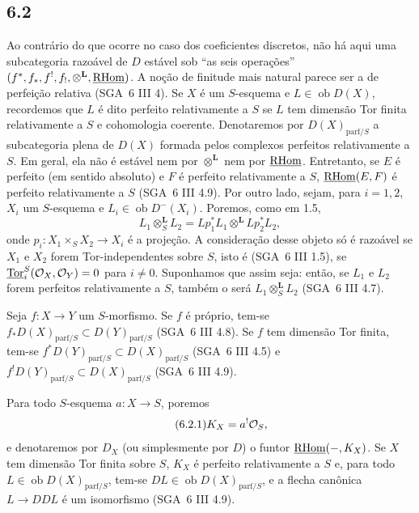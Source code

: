 \subsection*{6.2}
Ao contrário do que ocorre no caso dos coeficientes discretos, não há aqui uma subcategoria razoável de $D$ estável sob ``as seis operações'' $(f^*,f_*,f^!,f_!,\otimes^{\mathbf L},\underline{\mathrm{RHom}})$. A noção de finitude mais natural parece ser a de perfeição relativa (SGA~6 III 4). Se $X$ é um $S$-esquema e $L\in\operatorname{ob}D(X)$, recordemos que $L$ é dito perfeito relativamente a $S$ se $L$ tem dimensão Tor finita relativamente a $S$ e cohomologia coerente. Denotaremos por $D(X)_{\mathrm{parf}/S}$ a subcategoria plena de $D(X)$ formada pelos complexos perfeitos relativamente a $S$. Em geral, ela não é estável nem por $\otimes^{\mathbf L}$ nem por $\underline{\mathrm{RHom}}$. Entretanto, se $E$ é perfeito (em sentido absoluto) e $F$ é perfeito relativamente a $S$, $\underline{\mathrm{RHom}}(E,F)$ é perfeito relativamente a $S$ (SGA~6 III 4.9). Por outro lado, sejam, para $i=1,2$, $X_i$ um $S$-esquema e $L_i\in\operatorname{ob}D^{-}(X_i)$. Poremos, como em 1.5,
\[
L_1\otimes_S^{\mathbf L}L_2=Lp_1^*L_1\otimes^{\mathbf L}Lp_2^*L_2,
\]
onde $p_i:X_1\times_SX_2\to X_i$ é a projeção. A consideração desse objeto só é razoável se $X_1$ e $X_2$ forem Tor-independentes sobre $S$, isto é (SGA~6 III 1.5), se $\underline{\operatorname{Tor}}_i^S(\mathcal{O}_X,\mathcal{O}_Y)=0$ para $i\ne0$. Suponhamos que assim seja: então, se $L_1$ e $L_2$ forem perfeitos relativamente a $S$, também o será $L_1\otimes_S^{\mathbf L}L_2$ (SGA~6 III 4.7).

Seja $f:X\to Y$ um $S$-morfismo. Se $f$ é próprio, tem-se $f_*D(X)_{\mathrm{parf}/S}\subset D(Y)_{\mathrm{parf}/S}$ (SGA~6 III 4.8). Se $f$ tem dimensão Tor finita, tem-se $f^*D(Y)_{\mathrm{parf}/S}\subset D(X)_{\mathrm{parf}/S}$ (SGA~6 III 4.5) e $f^!D(Y)_{\mathrm{parf}/S}\subset D(X)_{\mathrm{parf}/S}$ (SGA~6 III 4.9).

Para todo $S$-esquema $a:X\to S$, poremos
\begin{equation}
\tag{6.2.1}
K_X=a^!\mathcal{O}_S,
\end{equation}
e denotaremos por $D_X$ (ou simplesmente por $D$) o funtor $\underline{\mathrm{RHom}}(-,K_X)$. Se $X$ tem dimensão Tor finita sobre $S$, $K_X$ é perfeito relativamente a $S$ e, para todo $L\in\operatorname{ob}D(X)_{\mathrm{parf}/S}$, tem-se $DL\in\operatorname{ob}D(X)_{\mathrm{parf}/S}$, e a flecha canônica $L\to DDL$ é um isomorfismo (SGA~6 III 4.9).

